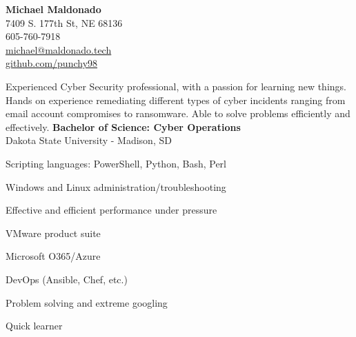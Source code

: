\documentclass[a4paper,10pt]{article}
\begin{document}
\begin{center}
    \textbf{\LARGE Michael Maldonado} \\
    7409 S. 177th St, NE 68136 \\
    605-760-7918 \\
    \href{mailto:michael@maldonado.tech}{michael@maldonado.tech} \\
    \href{https://github.com/punchy98}{github.com/punchy98}
\end{center}

Experienced Cyber Security professional, with a passion for learning new things. Hands on experience remediating different types of cyber incidents ranging from email account compromises to ransomware. Able to solve problems efficiently and effectively. 
\textbf{Bachelor of Science: Cyber Operations} \\
Dakota State University - Madison, SD 

\begin{itemize}
    \begin{multicols}{2}
    \item Scripting languages: PowerShell, Python, Bash, Perl
    \item Windows and Linux administration/troubleshooting
    \item Effective and efficient performance under pressure
    \item VMware product suite
    \item Microsoft O365/Azure
    \item DevOps (Ansible, Chef, etc.)
    \item Problem solving and extreme googling
    \item Quick learner
    \end{multicols}
\end{itemize}

\end{document}
